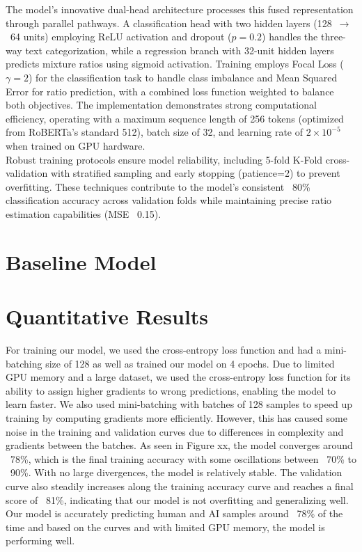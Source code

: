 \documentclass{article} %
\begin{document}
The model's innovative dual-head architecture processes this fused representation through parallel pathways. A classification head with two hidden layers (128~$\rightarrow$~64 units) employing ReLU activation and dropout ($p = 0.2$) handles the three-way text categorization, while a regression branch with 32-unit hidden layers predicts mixture ratios using sigmoid activation. Training employs Focal Loss ($\gamma = 2$) for the classification task to handle class imbalance and Mean Squared Error for ratio prediction, with a combined loss function weighted to balance both objectives. The implementation demonstrates strong computational efficiency, operating with a maximum sequence length of 256 tokens (optimized from RoBERTa's standard 512), batch size of 32, and learning rate of $2 \times 10^{-5}$ when trained on GPU hardware.\\

Robust training protocols ensure model reliability, including 5-fold K-Fold cross-validation with stratified sampling and early stopping (patience=2) to prevent overfitting. These techniques contribute to the model's consistent ~80\% classification accuracy across validation folds while maintaining precise ratio estimation capabilities (MSE ~0.15). 


\section{Baseline Model}








\section{Quantitative Results}
For training our model, we used the cross-entropy loss function and had a mini-batching size of 128 as well as trained our model on 4 epochs. 
Due to limited GPU memory and a large dataset, we used the cross-entropy loss function for its ability to assign higher gradients to wrong predictions, enabling the model to learn faster. We also used mini-batching with batches of 128 samples to speed up training by computing gradients more efficiently. However, this has caused  some noise in the training and validation curves due to differences in complexity and gradients between the batches. As seen in Figure xx, the model converges around ~78\%, which is the final training accuracy with some oscillations between ~70\% to ~90\%. With no large divergences, the model is relatively stable. The validation curve also steadily increases along the training accuracy curve and reaches a final score of ~81\%, indicating that our model is not overfitting and generalizing well. Our model is accurately predicting human and AI samples around ~78\% of the time and based on the curves and with limited GPU memory, the model is performing well.
\end{document}
